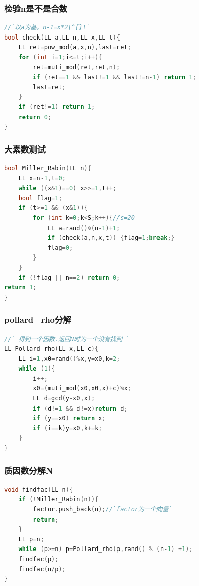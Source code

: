 \documentclass[a4paper]{article}
\begin{document}
\begin{CJK*}{UTF8}{gbsn}
\begin{multicols}{3}
\begin{flushleft}
\subsubsection{检验n是不是合数}
\begin{lstlisting}[language={c++}]
//`以a为基，n-1=x*2\^{}t`
bool check(LL a,LL n,LL x,LL t){   
    LL ret=pow_mod(a,x,n),last=ret;
    for (int i=1;i<=t;i++){
        ret=muti_mod(ret,ret,n);
        if (ret==1 && last!=1 && last!=n-1) return 1;
        last=ret;
    }
    if (ret!=1) return 1;
    return 0;
}
\end{lstlisting}



\subsubsection{大素数测试}
\begin{lstlisting}[language={c++}]
bool Miller_Rabin(LL n){
    LL x=n-1,t=0;
    while ((x&1)==0) x>>=1,t++;
    bool flag=1;
    if (t>=1 && (x&1)){
        for (int k=0;k<S;k++){//s=20
            LL a=rand()%(n-1)+1;
            if (check(a,n,x,t)) {flag=1;break;}
            flag=0;
        }
    }
    if (!flag || n==2) return 0;
return 1;   
}
\end{lstlisting}

\subsubsection{pollard\_rho分解}
\begin{lstlisting}[language={c++}]
//` 得到一个因数.返回N时为一个没有找到 `
LL Pollard_rho(LL x,LL c){
    LL i=1,x0=rand()%x,y=x0,k=2;
    while (1){
        i++;
        x0=(muti_mod(x0,x0,x)+c)%x;
        LL d=gcd(y-x0,x);
        if (d!=1 && d!=x)return d;
        if (y==x0) return x;
        if (i==k)y=x0,k+=k;
    }
}
\end{lstlisting}


\subsubsection{质因数分解N }
\begin{lstlisting}[language={c++}]
void findfac(LL n){           
    if (!Miller_Rabin(n)){
        factor.push_back(n);//`factor为一个向量`
        return;
    }
    LL p=n;
    while (p>=n) p=Pollard_rho(p,rand() % (n-1) +1);
    findfac(p);
    findfac(n/p);
}
\end{lstlisting}



\end{flushleft}
\end{multicols}
\end{CJK*}
\end{document}
